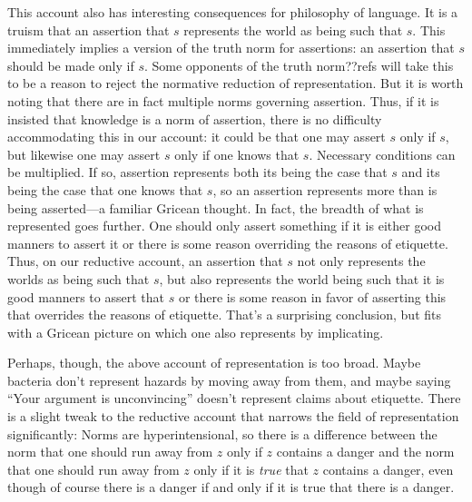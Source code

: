This account also has interesting consequences for philosophy of language. It is a truism that an assertion that 
$s$ represents the world as being such that $s$. This immediately implies a version of the truth norm
for assertions: an assertion that $s$ should be made only if $s$. Some opponents of the truth norm??refs 
will take this to be a reason to reject the normative reduction of representation. But it is worth noting
that there are in fact multiple norms governing assertion. Thus, if it is insisted that knowledge is a norm
of assertion, there is no difficulty accommodating this in our account: it could be that one may 
assert $s$ only if $s$, but likewise one may assert $s$ only if one knows that $s$. Necessary conditions
can be multiplied. If so, 
assertion represents both its being the case that $s$ and its being the case that one knows that $s$, 
so an assertion represents more than is being asserted---a familiar Gricean thought. In fact, the breadth
of what is represented goes further. One should only assert something 
if it is either good manners to assert it or there is some reason overriding the reasons of 
etiquette. Thus, on our reductive account, an assertion that $s$ not only represents the worlds as being
such that $s$, but also represents the world being such that it is good manners to assert that $s$ or 
there is some reason in favor of asserting this that overrides the reasons of etiquette. That's a 
surprising conclusion, but fits with a Gricean picture on which one also represents by implicating.

Perhaps, though, the above account of representation is too broad. Maybe bacteria don't represent hazards by 
moving away from them, and maybe saying ``Your argument is unconvincing'' doesn't represent claims about etiquette.
There is a slight tweak to the reductive account that narrows the field of representation significantly:
Norms are hyperintensional, so there is a difference between the norm that one should run away from $z$ only if
$z$ contains a danger and the norm that one should run away from $z$ only if it is \textit{true} that $z$ contains 
a danger, even though of course there is a danger if and only if it is true that there is a danger.

